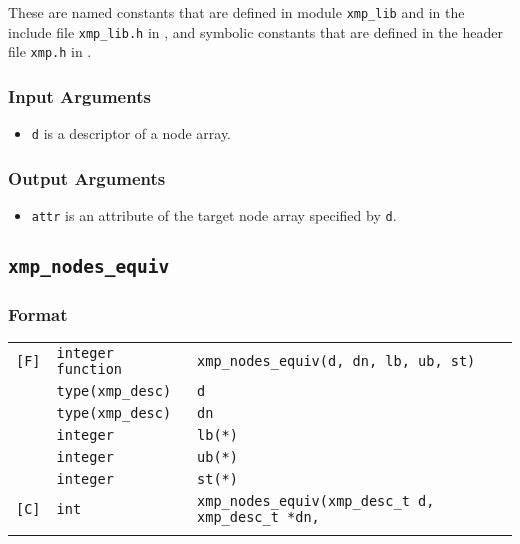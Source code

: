These are named constants that are defined in module {\tt xmp\_lib} 
and in the include file {\tt xmp\_lib.h} in {\XMPF}, and symbolic constants
that are defined in the header file {\tt xmp.h} in {\XMPC}.

\subsubsection*{Input Arguments}
\begin{itemize}
 \item {\tt d} is a descriptor of a node array.
\end{itemize}

\subsubsection*{Output Arguments}
\begin{itemize}
 \item {\tt attr} is an attribute of the target node array specified by
       {\tt d}.
\end{itemize}


\subsection{\tt xmp\_nodes\_equiv}

\subsubsection*{Format}

\begin{tabular}{lll}

\verb![F]!& {\tt integer function}& {\tt xmp\_nodes\_equiv(d, dn, lb,  ub, st)}\\
          & {\tt type(xmp\_desc)} & {\tt d}\\
          & {\tt type(xmp\_desc)} & {\tt dn}\\
          & {\tt integer}         & {\tt lb(*)}\\
          & {\tt integer}         & {\tt ub(*)}\\
          & {\tt integer}         & {\tt st(*)}\\

\verb![C]!&  {\tt int}& {\tt xmp\_nodes\_equiv(xmp\_desc\_t d, xmp\_desc\_t *dn,}\\
          &           & \hspace{3.1cm}{\tt int lb[], int ub[], int st[])}\\

\end{tabular}

